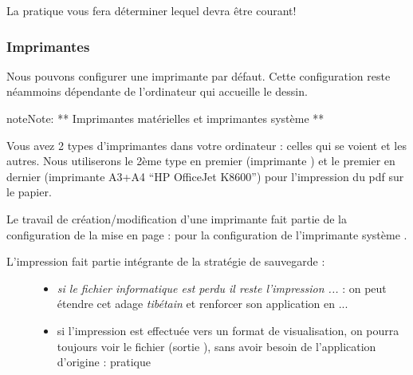 \documentclass[a4paper,12pt,french]{sphinxmanual}
\begin{document}
La pratique vous fera déterminer lequel devra être courant!


\subsubsection{Imprimantes}
\label{acad/config_acad:imprimantes}
Nous pouvons configurer une imprimante par défaut. Cette configuration reste néammoins dépendante de l'ordinateur qui accueille le dessin.

\begin{notice}{note}{Note:}
** Imprimantes matérielles et imprimantes système **

Vous avez 2 types d'imprimantes dans votre ordinateur : celles qui se voient et les autres. Nous utiliserons le 2ème type en premier (imprimante ) et le premier en dernier (imprimante A3+A4 ``HP OfficeJet K8600'') pour l'impression du pdf sur le papier.
\end{notice}

Le travail de création/modification d'une imprimante fait partie de la configuration de la mise en page : {\hyperref[acad/config_acad:mise\string-en\string-page]{}} pour la configuration de l'imprimante système .
\begin{description}
\item[{L'impression fait partie intégrante de la stratégie de sauvegarde :}] \leavevmode\begin{itemize}
\item {} 
\emph{si le fichier informatique est perdu il reste l'impression ...} : on peut étendre cet adage \emph{tibétain} et renforcer son application en ...

\item {} 
si l'impression est effectuée vers un format de visualisation, on pourra toujours voir le fichier (sortie ), sans avoir besoin de l'application d'origine : pratique

\end{itemize}

\end{description}
\end{document}
